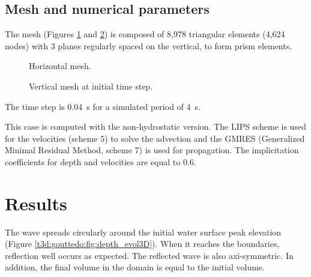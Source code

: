 \subsection{Mesh and numerical parameters}
\bigskip
The mesh (Figures \ref{t3d:gouttedo:fig:meshH} and \ref{t3d:gouttedo:fig:meshV})
is composed of 8,978 triangular elements (4,624 nodes) with 3 planes  
regularly spaced on the vertical, to form prism elements.

\begin{figure}[!htbp]
 \centering
 \caption{Horizontal mesh.}
 \label{t3d:gouttedo:fig:meshH}
\end{figure}
\begin{figure}[!htbp]
 \centering
 \caption{Vertical mesh at initial time step.}
 \label{t3d:gouttedo:fig:meshV}
\end{figure}
\bigskip
The time step is 0.04~s for a simulated period of 4~s. 

\bigskip
This case is computed with the non-hydrostatic version. The LIPS scheme 
is used for the velocities (scheme 5) to solve the advection and 
the GMRES (Generalized Minimal Residual Method, scheme 7) 
is used for propagation. The implicitation coefficients for depth 
and velocities are equal to 0.6.


\section{Results}
\bigskip
The wave spreads circularly around the initial water surface peak
elevation (Figure \ref{t3d:gouttedo:fig:depth_evol3D}).
When it reaches the boundaries, reflection well occurs as expected.
The reflected wave is also axi-symmetric.
In addition, the final volume in the domain is equal to the initial volume.

